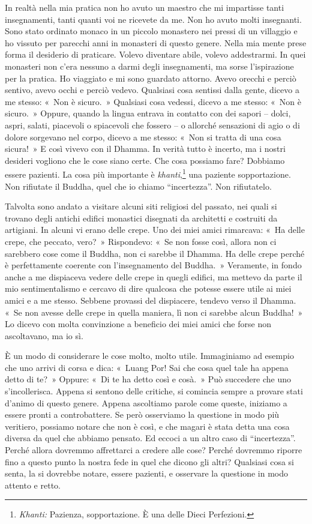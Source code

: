 In realtà nella mia pratica non ho avuto un maestro che mi impartisse
tanti insegnamenti, tanti quanti voi ne ricevete da me. Non ho avuto
molti insegnanti. Sono stato ordinato monaco in un piccolo monastero nei
pressi di un villaggio e ho vissuto per parecchi anni in monasteri di
questo genere. Nella mia mente prese forma il desiderio di praticare.
Volevo diventare abile, volevo addestrarmi. In quei monasteri non c'era
nessuno a darmi degli insegnamenti, ma sorse l'ispirazione per la
pratica. Ho viaggiato e mi sono guardato attorno. Avevo orecchi e perciò
sentivo, avevo occhi e perciò vedevo. Qualsiasi cosa sentissi dalla
gente, dicevo a me stesso: «~Non è sicuro.~» Qualsiasi cosa vedessi,
dicevo a me stesso: «~Non è sicuro.~» Oppure, quando la lingua entrava
in contatto con dei sapori -- dolci, aspri, salati, piacevoli o
spiacevoli che fossero -- o allorché sensazioni di agio o di dolore
sorgevano nel corpo, dicevo a me stesso: «~Non si tratta di una cosa
sicura!~» E così vivevo con il Dhamma. In verità tutto è incerto, ma i
nostri desideri vogliono che le cose siano certe. Che cosa possiamo
fare? Dobbiamo essere pazienti. La cosa più importante è
\emph{khanti},\footnote{\emph{Khanti:} Pazienza, sopportazione. È una
  delle Dieci Perfezioni.} una paziente sopportazione. Non rifiutate il
Buddha, quel che io chiamo ``incertezza''. Non rifiutatelo.

Talvolta sono andato a visitare alcuni siti religiosi del passato, nei
quali si trovano degli antichi edifici monastici disegnati da architetti
e costruiti da artigiani. In alcuni vi erano delle crepe. Uno dei miei
amici rimarcava: «~Ha delle crepe, che peccato, vero?~» Rispondevo: «~Se
non fosse così, allora non ci sarebbero cose come il Buddha, non ci
sarebbe il Dhamma. Ha delle crepe perché è perfettamente coerente con
l'insegnamento del Buddha.~» Veramente, in fondo anche a me dispiaceva
vedere delle crepe in quegli edifici, ma mettevo da parte il mio
sentimentalismo e cercavo di dire qualcosa che potesse essere utile ai
miei amici e a me stesso. Sebbene provassi del dispiacere, tendevo verso
il Dhamma. «~Se non avesse delle crepe in quella maniera, lì non ci
sarebbe alcun Buddha!~» Lo dicevo con molta convinzione a beneficio dei
miei amici che forse non ascoltavano, ma io sì.

È un modo di considerare le cose molto, molto utile. Immaginiamo ad
esempio che uno arrivi di corsa e dica: «~Luang Por! Sai che cosa quel
tale ha appena detto di te?~» Oppure: «~Di te ha detto così e cosà.~»
Può succedere che uno s'incollerisca. Appena si sentono delle critiche,
si comincia sempre a provare stati d'animo di questo genere. Appena
ascoltiamo parole come queste, iniziamo a essere pronti a controbattere.
Se però osserviamo la questione in modo più veritiero, possiamo notare
che non è così, e che magari è stata detta una cosa diversa da quel che
abbiamo pensato. Ed eccoci a un altro caso di ``incertezza''. Perché
allora dovremmo affrettarci a credere alle cose? Perché dovremmo riporre
fino a questo punto la nostra fede in quel che dicono gli altri?
Qualsiasi cosa si senta, la si dovrebbe notare, essere pazienti, e
osservare la questione in modo attento e retto.

